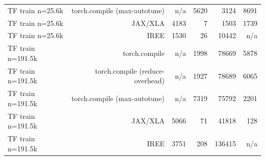 \begin{tabular}{lrrrrr}
TF train n=25.6k & torch.compile (max-autotune) & n/a & 5620 & 3124 & 8691 \\
TF train n=25.6k & JAX/XLA & 4183 & 7 & 1503 & 1739 \\
TF train n=25.6k & IREE & 1530 & 26 & 10442 & n/a \\
TF train n=191.5k & torch.compile & n/a & 1998 & 78669 & 5878 \\
TF train n=191.5k & torch.compile (reduce-overhead) & n/a & 1927 & 78689 & 6065 \\
TF train n=191.5k & torch.compile (max-autotune) & n/a & 7319 & 75792 & 2201 \\
TF train n=191.5k & JAX/XLA & 5066 & 71 & 41818 & 128 \\
TF train n=191.5k & IREE & 3751 & 208 & 136415 & n/a \\
\bottomrule
\end{tabular}
